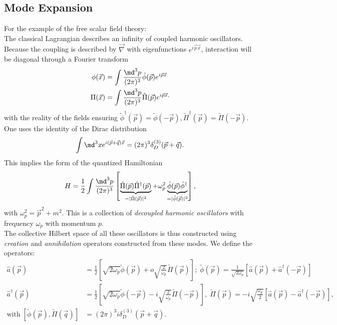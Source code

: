 \subsection{Mode Expansion}
For the example of the free scalar field theory:\\
The classical Lagrangian describes an infinity of coupled harmonic oscillators. Because the coupling is described by $\vec{\nabla}$ with eigenfunctions $e^{i \vec{p} \vec{x}}$, interaction will be diagonal through a Fourier transform
\begin{align}
	\phi(\vec{x}) &= \int \frac{\md^3 p}{(2\pi)^3} \tilde{\phi}(\vec{p}) e^{i \vec{p} \vec{x}} \\
	\Pi (\vec{x}) &= \int \frac{\md^3 p}{(2 \pi)^3} \tilde{\Pi}(\vec{p}) e^{i \vec{p}\vec{x},}
\end{align}
with the reality of the fields ensuring $\tilde{\phi}^{\dagger}(\vec{p})=\tilde{\phi}(-\vec{p}), \tilde{\Pi}^{\dagger}(\vec{p})=\tilde{\Pi}(-\vec{p})$.
One uses the identity of the Dirac distribution 
\begin{equation}
	\int \md^3 x e^{i(\vec{p}+\vec{q}) \vec{x}} = (2 \pi)^3 \delta^{(3)}_D(\vec{p}+\vec{q}).
\end{equation}
This implies the form of the quantized Hamiltonian
\begin{equation}
H = \frac{1}{2} \int \frac{\md^3 p}{(2\pi)^3} \left[\underbrace{\tilde{\Pi}(\vec{p}) \tilde{\Pi}^{\dagger}(\vec{p})}_{=|\tilde{\Pi}(\vec{p}) |^2} + \omega^2_p \underbrace{\tilde{\phi}(\vec{p}) \tilde{\phi}^{\dagger}}_{=|\tilde{\phi}(\vec{p})|^2}\right],
\end{equation}
with $\omega^2_p = \vec{p}^2+m^2$. This is a collection of \emph{decoupled harmonic oscillators} with frequency $\omega_p$ with momentum $p$.\\
The collective Hilbert space of all these oscillators is thus constructed using \emph{creation} and \emph{annihilation} operators constructed from these modes. We define the operators:
\begin{align}
	\hat{a}(\vec{p})&= \frac{1}{2} \left[\sqrt{2 \omega_p} \tilde{\phi}(\vec{p}) + o \sqrt{\frac{2}{\omega_p}} \tilde{\Pi} (\vec{p})\right]; \; \tilde{\phi}(\vec{p}) = \frac{1}{\sqrt{2 \omega_p}} \left[\hat{a}(\vec{p}) + \hat{a}^{\dagger}(-\vec{p})\right] \\
	\hat{a}^{\dagger}(\vec{p}) &= \frac{1}{2} \left[\sqrt{2 \omega_p} \tilde{\phi}(-\vec{p}) -i \sqrt{\frac{2}{\omega_p}} \tilde{\Pi}(-\vec{p})\right],\; \tilde{\Pi}(\vec{p}) =-i \sqrt{\frac{\omega_p}{2}} \left[\hat{a}(\vec{p}) - \hat{a}^{\dagger} (-\vec{p})\right],\\
	\mathrm{with} \; \left[\tilde{\phi}(\vec{p}), \tilde{\Pi}(\vec{q}) \right] &= (2 \pi)^3 i \delta^{(3)}_D(\vec{p}+\vec{q}).
\end{align}
